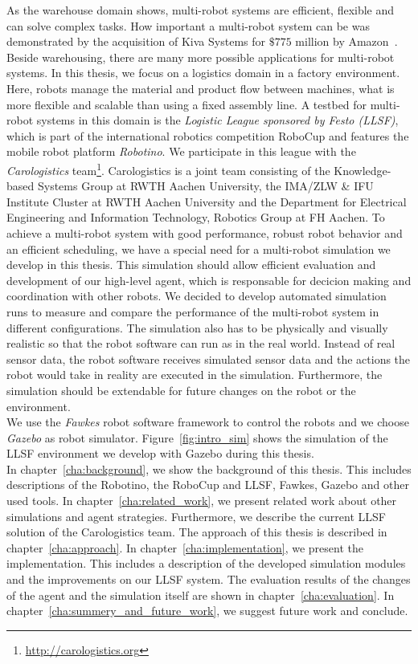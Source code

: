As the warehouse domain shows, multi-robot systems are efficient, flexible and can solve complex tasks. How important a multi-robot system can be was demonstrated by the acquisition of Kiva Systems for $\$775$ million by Amazon~\cite{kiva_amazon}. Beside warehousing, there are many more possible applications for multi-robot systems. In this thesis, we focus on a logistics domain in a factory environment. Here, robots manage the material and product flow between machines, what is more flexible and scalable than using a fixed assembly line. A testbed for multi-robot systems in this domain is the \textit{Logistic League sponsored by Festo (LLSF)}, which is part of the international robotics competition RoboCup and features the mobile robot platform \textit{Robotino}. We participate in this league with the \textit{Carologistics} team\footnote{\url{http://carologistics.org}}. Carologistics is a joint team consisting of the Knowledge-based Systems Group at RWTH Aachen University, the IMA/ZLW \& IFU Institute Cluster at RWTH Aachen University and the Department for Electrical Engineering and Information Technology, Robotics Group at FH Aachen. To achieve a multi-robot system with good performance, robust robot behavior and an efficient scheduling, we have a special need for a multi-robot simulation we develop in this thesis. This simulation should allow efficient evaluation and development of our high-level agent, which is responsable for decicion making and coordination with other robots. We decided to develop automated simulation runs to measure and compare the performance of the multi-robot system in different configurations. The simulation also has to be physically and visually realistic so that the robot software can run as in the real world. Instead of real sensor data, the robot software receives simulated sensor data and the actions the robot would take in reality are executed in the simulation. Furthermore, the simulation should be extendable for future changes on the robot or the environment.\\
We use the \textit{Fawkes} robot software framework to control the robots and we choose \textit{Gazebo} as robot simulator. Figure~\ref{fig:intro_sim} shows the simulation of the LLSF environment we develop with Gazebo during this thesis.\\
In chapter~\ref{cha:background}, we show the background of this thesis. This includes descriptions of the Robotino, the RoboCup and LLSF, Fawkes, Gazebo and other used tools. In chapter~\ref{cha:related_work}, we present related work about other simulations and agent strategies. Furthermore, we describe the current LLSF solution of the Carologistics team. The approach of this thesis is described in chapter~\ref{cha:approach}. In chapter~\ref{cha:implementation}, we present the implementation. This includes a description of the developed simulation modules and the improvements on our LLSF system. The evaluation results of the changes of the agent and the simulation itself are shown in chapter~\ref{cha:evaluation}. In chapter~\ref{cha:summery_and_future_work}, we suggest future work and conclude.



